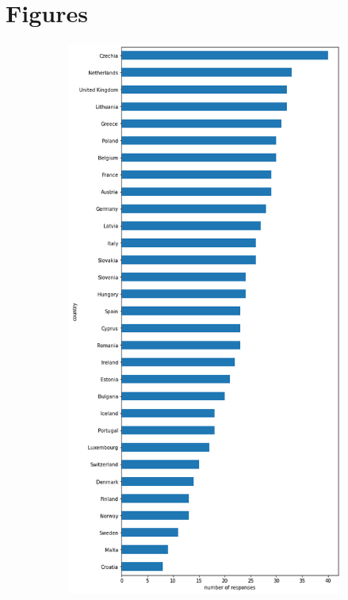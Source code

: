 \documentclass[11pt]{article}
\begin{document}
\section{Figures}\label{appendix:figure}
\begin{figure}[h]
     \centering
     \begin{subfigure}[b]{0.4\textwidth}
         \centering
         \includegraphics[width=\textwidth]{hist_response_by_countries.png}

\end{subfigure}
\end{figure}
\end{document}
